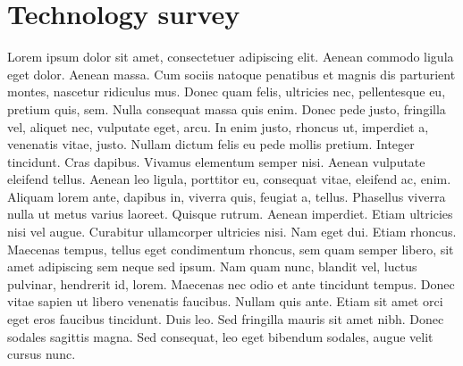 \section{Technology survey}

Lorem ipsum dolor sit amet, consectetuer adipiscing elit. Aenean commodo ligula eget dolor. Aenean massa. Cum sociis natoque penatibus et magnis dis parturient montes, nascetur ridiculus mus. Donec quam felis, ultricies nec, pellentesque eu, pretium quis, sem. Nulla consequat massa quis enim. Donec pede justo, fringilla vel, aliquet nec, vulputate eget, arcu. In enim justo, rhoncus ut, imperdiet a, venenatis vitae, justo. Nullam dictum felis eu pede mollis pretium. Integer tincidunt. Cras dapibus. Vivamus elementum semper nisi. Aenean vulputate eleifend tellus. Aenean leo ligula, porttitor eu, consequat vitae, eleifend ac, enim. Aliquam lorem ante, dapibus in, viverra quis, feugiat a, tellus. Phasellus viverra nulla ut metus varius laoreet. Quisque rutrum. Aenean imperdiet. Etiam ultricies nisi vel augue. Curabitur ullamcorper ultricies nisi. Nam eget dui. Etiam rhoncus. Maecenas tempus, tellus eget condimentum rhoncus, sem quam semper libero, sit amet adipiscing sem neque sed ipsum. Nam quam nunc, blandit vel, luctus pulvinar, hendrerit id, lorem. Maecenas nec odio et ante tincidunt tempus. Donec vitae sapien ut libero venenatis faucibus. Nullam quis ante. Etiam sit amet orci eget eros faucibus tincidunt. Duis leo. Sed fringilla mauris sit amet nibh. Donec sodales sagittis magna. Sed consequat, leo eget bibendum sodales, augue velit cursus nunc.
